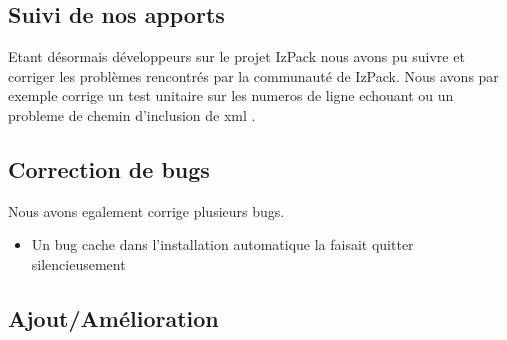 \subsection{Suivi de nos apports}
Etant désormais développeurs sur le projet IzPack nous avons pu suivre et corriger les problèmes rencontrés par la communauté de IzPack.
Nous avons par exemple corrige un test unitaire sur les numeros de ligne echouant \cite{IZPACK-306} ou un probleme de chemin d'inclusion de xml \cite{IZPACK-303}.

\subsection{Correction de bugs}
Nous avons egalement corrige plusieurs bugs.
\begin{itemize}
 \item Un bug cache dans l'installation automatique la faisait quitter silencieusement \cite{IZPACK-309}
\end{itemize}

\subsection{Ajout/Amélioration}
